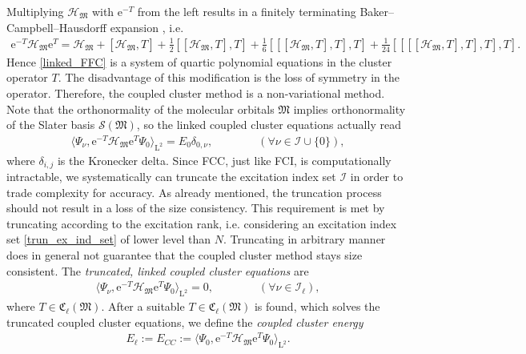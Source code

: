 \documentclass[reqno]{amsart}
\begin{document}
Multiplying $\mathcal{H}_\mathfrak{M}$ with $\mathrm{e}^{-T}$ from the left results in a finitely terminating Baker–Campbell–Hausdorff expansion \cite{crawford}, i.e.
\begin{align*}
    \mathrm{e}^{-T}\mathcal{H}_\mathfrak{M}\mathrm{e}^T=\mathcal{H}_\mathfrak{M}+[\mathcal{H}_\mathfrak{M},T]+\frac{1}{2}[[\mathcal{H}_\mathfrak{M},T],T]+\frac{1}{6}[[[\mathcal{H}_\mathfrak{M},T],T],T]+\frac{1}{24}[[[[\mathcal{H}_\mathfrak{M},T],T],T],T].
\end{align*}
Hence \eqref{linked_FFC} is a system of quartic polynomial equations in the cluster operator $T$. The disadvantage of this modification is the loss of symmetry in the operator. Therefore, the coupled cluster method is a non-variational method. Note that the orthonormality of the molecular orbitals $\mathfrak{M}$ implies orthonormality of the Slater basis $\mathcal{S}(\mathfrak{M})$, so the linked coupled cluster equations actually read
\begin{align}
    \langle \Psi_\nu, \mathrm{e}^{-T}\mathcal{H}_\mathfrak{M}\mathrm{e}^T\Psi_0\rangle_{\mathrm{L}^2}=E_0 \delta_{ 0,\nu},\qquad\qquad(\forall \nu\in \mathscr{I}\cup\lbrace0\rbrace),
\end{align}
where $\delta_{i,j}$ is the Kronecker delta. Since FCC, just like FCI, is computationally intractable, we systematically can truncate the excitation index set $\mathscr{I}$ in order to trade complexity for accuracy. As already mentioned, the truncation process should not result in a loss of the size consistency. This requirement is met by truncating according to the excitation rank, i.e. considering an excitation index set \eqref{trun_ex_ind_set} of lower level than $N$. Truncating in arbitrary manner does in general not guarantee that the coupled cluster method stays size consistent. The \textit{truncated, linked coupled cluster equations} are
\begin{align}\label{trun_cc_eq}
    \langle \Psi_\nu, \mathrm{e}^{-T}\mathcal{H}_\mathfrak{M}\mathrm{e}^T\Psi_0\rangle_{\mathrm{L}^2}=0,\qquad\qquad(\forall \nu\in \mathscr{I}_\ell),
\end{align}
where $T\in \mathfrak{C}_\ell(\mathfrak{M})$. After a suitable $T\in \mathfrak{C}_\ell(\mathfrak{M})$ is found, which solves the truncated coupled cluster equations, we define the \textit{coupled cluster energy}
\begin{align}\label{cc_energy}
     E_{\ell}:=E_{CC}:=\langle \Psi_0, \mathrm{e}^{-T}\mathcal{H}_\mathfrak{M}\mathrm{e}^T\Psi_0\rangle_{\mathrm{L}^2}.
\end{align}
\end{document}
